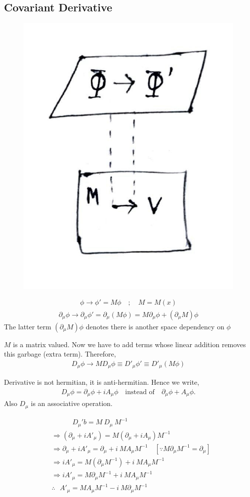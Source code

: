\documentclass[14pt]{article} %
\begin{document}
\subsection{Covariant Derivative}
\begin{figure}[H]
    \centering
    \includegraphics[width=0.3\linewidth]{figures/C09_3.jpeg}
    \caption*{}
\end{figure}
\vspace{-1.5cm}
\begin{align*}
\phi \rightarrow \phi' = M \phi \quad; \quad M = M(x)
\end{align*}
\begin{align*}
\partial_\mu \phi \to  \partial_\mu \phi' =\partial_\mu (M \phi) = M \partial_\mu \phi + (\partial_\mu M) \phi
\end{align*}
The latter term $(\partial_\mu M) \phi$ denotes there is another space dependency on $\phi$

$M$ is a matrix valued. Now we have to add terms whose linear addition removes this garbage (extra term). Therefore,
\begin{align*}
D_\mu \phi \to M D_\mu \phi \equiv D'_\mu \phi' \equiv D'_\mu (M \phi)
\end{align*}
\begin{tcolorbox}
Derivative is not hermitian, it is anti-hermitian. Hence we write,
\begin{align*}
D_\mu \phi = \partial_\mu \phi + i A_\mu \phi \quad \text{instead of} \quad \partial_\mu \phi + A_\mu \phi.
\end{align*}
Also $D_\mu$ is an associative operation.
\end{tcolorbox}

\begin{align*}
&\quad \quad \quad D_\mu'b = M ~D_\mu ~ M^{-1} \\
&\Rightarrow (\partial_\mu + i A'_\mu) = M (\partial_\mu + i A_\mu) M^{-1} \\
&\Rightarrow \partial_\mu + i A'_\mu = \partial_\mu + i ~M A_\mu M^{-1} \quad [\because M \partial_\mu M^{-1} = \partial_\mu]\\
&\Rightarrow i A'_\mu = M (\partial_\mu M^{-1}) + i~ M A_\mu M^{-1}\\
&\Rightarrow i A'_\mu = M \partial_\mu M^{-1} + i ~M A_\mu M^{-1} \\
&\therefore ~~~ A'_\mu = M A_\mu M^{-1} - i ~M \partial_\mu M^{-1}
\end{align*}
\end{document}
